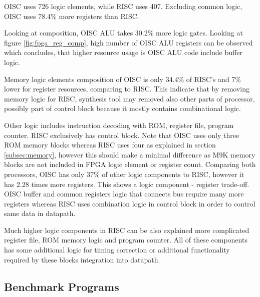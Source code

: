 OISC uses 726 logic elements, while RISC uses 407. Excluding common logic, OISC uses 78.4\% more registers than RISC.

Looking at composition, OISC ALU takes 30.2\% more logic gates. Looking at figure \ref{fig:fpga_reg_comp}, high number of OISC ALU registers can be observed which concludes, that higher resource usage is OISC ALU code include buffer logic.

Memory logic elements composition of OISC is only 34.4\% of RISC's and 7\% lower for register resources, comparing to RISC. This indicate that by removing memory logic for RISC, synthesis tool may removed also other parts of processor, possibly part of control block because it mostly contains combinational logic.

Other logic includes instruction decoding with ROM, register file, program counter. RISC exclusively has control block. Note that OISC uses  only three ROM memory blocks whereas RISC uses four as explained in section \ref{subsec:memory}, however this should make a minimal difference as M9K memory blocks are not included in FPGA logic element or register count. Comparing both processors, OISC has only 37\% of other logic components to RISC, however it has 2.28 times more registers. This shows a logic component - register trade-off. OISC buffer and common registers logic that connects bus require many more registers whereas RISC uses combination logic in control block in order to control same data in datapath. 

Much higher logic components in RISC can be also explained more complicated register file, ROM memory logic and program counter. All of these components has some additional logic for timing correction or additional functionality required by these blocks integration into datapath.

\subsection{Benchmark Programs}


